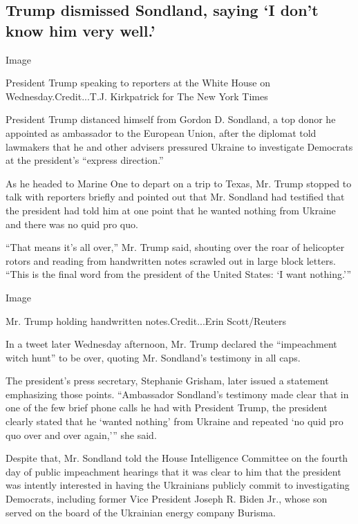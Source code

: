 \hypertarget{trump-dismissed-sondland-saying-i-dont-know-him-very-well}{%
\subsection{Trump dismissed Sondland, saying `I don't know him very
well.'}\label{trump-dismissed-sondland-saying-i-dont-know-him-very-well}}

Image

President Trump speaking to reporters at the White House on
Wednesday.Credit...T.J. Kirkpatrick for The New York Times

President Trump distanced himself from Gordon D. Sondland, a top donor
he appointed as ambassador to the European Union, after the diplomat
told lawmakers that he and other advisers pressured Ukraine to
investigate Democrats at the president's ``express direction.''

As he headed to Marine One to depart on a trip to Texas, Mr. Trump
stopped to talk with reporters briefly and pointed out that Mr. Sondland
had testified that the president had told him at one point that he
wanted nothing from Ukraine and there was no quid pro quo.

``That means it's all over,'' Mr. Trump said, shouting over the roar of
helicopter rotors and reading from handwritten notes scrawled out in
large block letters. ``This is the final word from the president of the
United States: `I want nothing.'''

Image

Mr. Trump holding handwritten notes.Credit...Erin Scott/Reuters

In a tweet later Wednesday afternoon, Mr. Trump declared the
``impeachment witch hunt'' to be over, quoting Mr. Sondland's testimony
in all caps.

The president's press secretary, Stephanie Grisham, later issued a
statement emphasizing those points. ``Ambassador Sondland's testimony
made clear that in one of the few brief phone calls he had with
President Trump, the president clearly stated that he `wanted nothing'
from Ukraine and repeated `no quid pro quo over and over again,''' she
said.

Despite that, Mr. Sondland told the House Intelligence Committee on the
fourth day of public impeachment hearings that it was clear to him that
the president was intently interested in having the Ukrainians publicly
commit to investigating Democrats, including former Vice President
Joseph R. Biden Jr., whose son served on the board of the Ukrainian
energy company Burisma.

